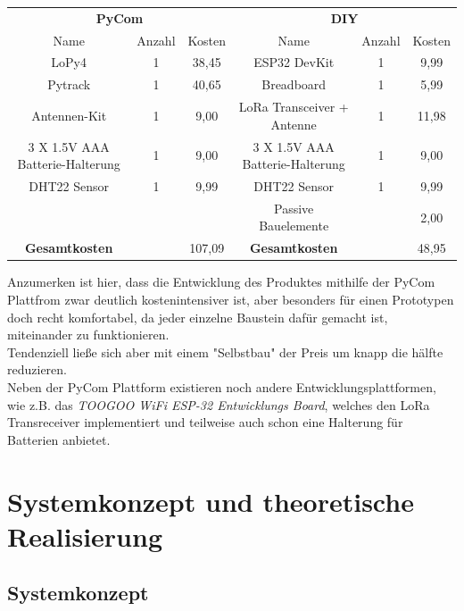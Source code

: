 \begin{adjustwidth}{-1in}{-1in}%
	\begin{center}
	
	        \begin{tabular}{ccc|ccc}
			\toprule
			\multicolumn{3}{c}{\textbf{PyCom}} & \multicolumn{3}{c}{\textbf{DIY}}\\
	
			Name & Anzahl & Kosten & Name & Anzahl & Kosten\\

			\midrule
			LoPy4 & 1 & 38,45 & ESP32 DevKit & 1 & 9,99\\
			Pytrack  & 1 & 40,65 & Breadboard & 1 & 5,99\\
			Antennen-Kit  & 1 & 9,00 & LoRa Transceiver + Antenne & 1 & 11,98\\
			3 X 1.5V AAA Batterie-Halterung & 1 & 9,00 & 3 X 1.5V AAA Batterie-Halterung & 1 & 9,00 \\
			DHT22 Sensor & 1 & 9,99 & DHT22 Sensor & 1 & 9,99\\
			 &  &  & Passive Bauelemente &  & 2,00\\

			\midrule
			\textbf{Gesamtkosten} & & 107,09 & \textbf{Gesamtkosten} & & 48,95\\

			\bottomrule
	
	        \end{tabular}
		\label{}
		 \label{tab:kostenaustellung} 
	\end{center}
\end{adjustwidth}

Anzumerken ist hier, dass die Entwicklung des Produktes mithilfe der PyCom Plattfrom zwar deutlich kostenintensiver ist, aber besonders für einen Prototypen doch recht komfortabel, da jeder einzelne Baustein dafür gemacht ist, miteinander zu funktionieren.\\
Tendenziell ließe sich aber mit einem "Selbstbau" der Preis um knapp die hälfte reduzieren.\\
Neben der PyCom Plattform existieren noch andere Entwicklungsplattformen, wie z.B. das \textit{TOOGOO WiFi ESP-32 Entwicklungs Board}, welches den LoRa Transreceiver implementiert und teilweise auch schon eine Halterung für Batterien anbietet. 


\section{Systemkonzept und theoretische Realisierung} \label{Systemkonzept und theoretische Realisierung}

\subsection{Systemkonzept} \label{Systemkonzept}




